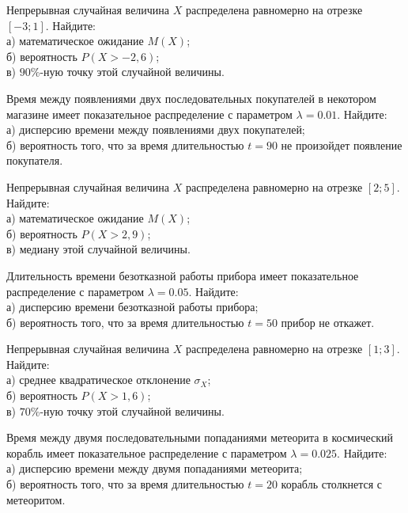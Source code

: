 

\z Непрерывная случайная величина $X$ распределена равномерно на отрезке $[-3; 1]$. Найдите: \\ \quad а) математическое ожидание $M(X)$; \\ \quad б) вероятность $P(X>-2{,}6)$; \\ \quad в) $90\%$-ную точку этой случайной величины.


\vfill

\z Время между появлениями двух последовательных покупателей в некотором магазине имеет показательное распределение с параметром $\lambda = 0.01$. Найдите: \\ \quad а) дисперсию времени между появлениями двух покупателей; \\ \quad б) вероятность того, что за время длительностью $t = 90$ не произойдет появление покупателя.
 

\vfill

\newpage\setcounter{zad}{0}

\z Непрерывная случайная величина $X$ распределена равномерно на отрезке $[2; 5]$. Найдите: \\ \quad а) математическое ожидание $M(X)$; \\ \quad б) вероятность $P(X>2{,}9)$; \\ \quad в) медиану этой случайной величины.


\vfill

\z Длительность времени безотказной работы прибора имеет показательное распределение с параметром $\lambda = 0.05$. Найдите: \\ \quad а) дисперсию времени безотказной работы прибора; \\ \quad б) вероятность того, что за время длительностью $t = 50$ прибор не откажет.
 

\vfill

\newpage\setcounter{zad}{0}

\z Непрерывная случайная величина $X$ распределена равномерно на отрезке $[1; 3]$. Найдите: \\ \quad а) среднее квадратическое отклонение $\sigma_X$; \\ \quad б) вероятность $P(X>1{,}6)$; \\ \quad в) $70\%$-ную точку этой случайной величины.


\vfill

\z Время между двумя последовательными попаданиями метеорита в космический корабль имеет показательное распределение с параметром $\lambda = 0.025$. Найдите: \\ \quad а) дисперсию времени между двумя попаданиями метеорита; \\ \quad б) вероятность того, что за время длительностью $t = 20$ корабль  столкнется с метеоритом.
 

